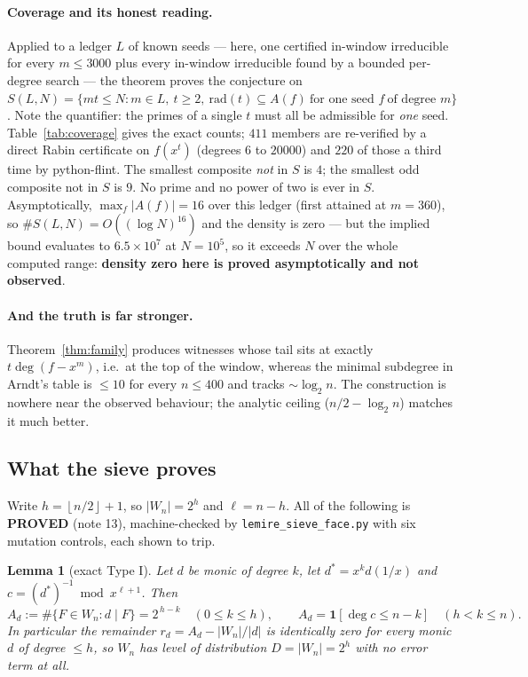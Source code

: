 \documentclass[10pt]{article}
\theoremstyle{plain}
\newtheorem{lemma}[theorem]{Lemma}
\theoremstyle{definition}
\newcommand{\flr}[1]{\left\lfloor #1\right\rfloor}
\newcommand{\proved}{\textcolor{proved}{\textsf{\textbf{\footnotesize PROVED}}}}
\begin{document}
\paragraph{Coverage and its honest reading.} Applied to a ledger $L$ of known
seeds --- here, one certified in-window irreducible for every $m\le3000$ plus
every in-window irreducible found by a bounded per-degree search --- the theorem
proves the conjecture on
$S(L,N)=\{mt\le N: m\in L,\ t\ge2,\ \mathrm{rad}(t)\subseteq A(f)\ \text{for one
seed }f\ \text{of degree }m\}$. Note the quantifier: the primes of a single $t$
must all be admissible for \emph{one} seed. Table~\ref{tab:coverage} gives the
exact counts; $411$ members are re-verified by a direct Rabin certificate on
$f(x^t)$ (degrees $6$ to $20000$) and $220$ of those a third time by
python-flint. The smallest composite \emph{not} in $S$ is $4$; the smallest odd
composite not in $S$ is $9$. No prime and no power of two is ever in $S$.
Asymptotically, $\max_f|A(f)|=16$ over this ledger (first attained at $m=360$),
so $\#S(L,N)=O((\log N)^{16})$ and the density is zero --- but the implied bound
evaluates to $6.5\times10^7$ at $N=10^5$, so it exceeds $N$ over the whole
computed range: \textbf{density zero here is proved asymptotically and not
observed}.

\paragraph{And the truth is far stronger.} Theorem~\ref{thm:family} produces
witnesses whose tail sits at exactly $t\deg(f-x^m)$, i.e.\ at the top of the
window, whereas the minimal subdegree in Arndt's table is $\le10$ for every
$n\le400$ and tracks $\sim\log_2 n$. The construction is nowhere near the
observed behaviour; the analytic ceiling ($n/2-\log_2 n$) matches it much better.

\subsection{What the sieve proves}\label{sec:sievepos}

Write $h=\flr{n/2}+1$, so $|W_n|=2^h$ and $\ell=n-h$. All of the following is
\proved{} (note 13), machine-checked by \texttt{lemire\_sieve\_face.py} with
six mutation controls, each shown to trip.

\begin{lemma}[exact Type I]\label{lem:typeI}
Let $d$ be monic of degree $k$, let $d^*=x^kd(1/x)$ and
$c=(d^*)^{-1}\bmod x^{\ell+1}$. Then
\[
 A_d:=\#\{F\in W_n: d\mid F\}=2^{\,h-k}\quad(0\le k\le h),
 \qquad
 A_d=\mathbf1[\deg c\le n-k]\quad(h<k\le n).
\]
In particular the remainder $r_d=A_d-|W_n|/|d|$ is \emph{identically zero} for
every monic $d$ of degree $\le h$, so $W_n$ has level of distribution
$D=|W_n|=2^h$ with no error term at all.
\end{lemma}
\end{document}
